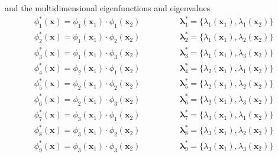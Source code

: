 \documentclass[]{interact}
\theoremstyle{plain}%
\theoremstyle{definition}
\theoremstyle{remark}
\begin{document}
\noindent and the multidimensional eigenfunctions and eigenvalues
%
\begin{eqnarray}
\phi^{\ast}_1(\bm{x}) = \phi_{1}(\bm{x}_1) \cdot \phi_{1}(\bm{x}_2)  \hspace{2cm}
%
\bm{\lambda}^{\ast}_1 = \{\lambda_{1}(\bm{x}_1), \lambda_{1}(\bm{x}_2)\}  \nonumber \\
%
\phi^{\ast}_2(\bm{x}) = \phi_{1}(\bm{x}_1) \cdot \phi_{2}(\bm{x}_2)  \hspace{2cm}
%
\bm{\lambda}^{\ast}_2 = \{\lambda_{1}(\bm{x}_1), \lambda_{2}(\bm{x}_2)\} \nonumber \\
%
\phi^{\ast}_3(\bm{x}) = \phi_{1}(\bm{x}_1) \cdot \phi_{3}(\bm{x}_2) \hspace{2cm}
%
\bm{\lambda}^{\ast}_3 = \{\lambda_{1}(\bm{x}_1), \lambda_{3}(\bm{x}_2)\}  \nonumber \\
%
\phi^{\ast}_4(\bm{x}) = \phi_{2}(\bm{x}_1) \cdot \phi_{1}(\bm{x}_2)  \hspace{2cm}
%
\bm{\lambda}^{\ast}_4 = \{\lambda_{2}(\bm{x}_1), \lambda_{1}(\bm{x}_2)\}  \nonumber \\
%
\phi^{\ast}_5(\bm{x}) = \phi_{2}(\bm{x}_1) \cdot \phi_{2}(\bm{x}_2)  \hspace{2cm}
%
\bm{\lambda}^{\ast}_5 = \{\lambda_{2}(\bm{x}_1), \lambda_{2}(\bm{x}_2)\}  \nonumber \\
%
\phi^{\ast}_6(\bm{x}) = \phi_{2}(\bm{x}_1) \cdot \phi_{3}(\bm{x}_2)  \hspace{2cm}
%
\bm{\lambda}^{\ast}_6 = \{\lambda_{2}(\bm{x}_1), \lambda_{3}(\bm{x}_2)\}  \nonumber \\
%
\phi^{\ast}_7(\bm{x}) = \phi_{3}(\bm{x}_1) \cdot \phi_{1}(\bm{x}_2)  \hspace{2cm}
%
\bm{\lambda}^{\ast}_7 = \{\lambda_{3}(\bm{x}_1), \lambda_{1}(\bm{x}_2)\}  \nonumber \\
%
\phi^{\ast}_8(\bm{x}) = \phi_{3}(\bm{x}_1) \cdot \phi_{2}(\bm{x}_2)  \hspace{2cm}
%
\bm{\lambda}^{\ast}_8 = \{\lambda_{3}(\bm{x}_1), \lambda_{2}(\bm{x}_2)\}  \nonumber \\
%
\phi^{\ast}_9(\bm{x}) = \phi_{3}(\bm{x}_1) \cdot \phi_{3}(\bm{x}_2)  \hspace{2cm}
%
\bm{\lambda}^{\ast}_9 = \{\lambda_{3}(\bm{x}_1), \lambda_{3}(\bm{x}_2)\}  \nonumber
\end{eqnarray}
\end{document}
